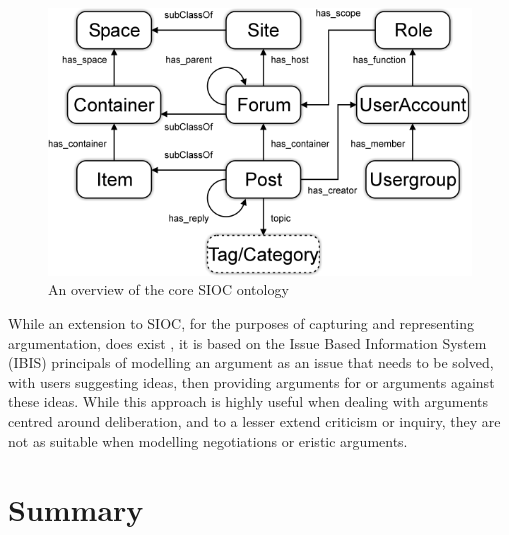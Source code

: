 \begin{figure}
\begin{center}
\includegraphics[scale=1.75]{./figures/ontologies/sioc.png}
\caption[An overview of the core SIOC ontology]{An overview of the core SIOC ontology\protect\footnotemark}
\label{figure:sioc}
\end{center}
\end{figure}

While an extension to SIOC, for the purposes of capturing and representing argumentation, does exist \citep{Lange2008}, it is based on the Issue Based Information System (IBIS) principals of modelling an argument as an issue that needs to be solved, with users suggesting ideas, then providing arguments for or arguments against these ideas. While this approach is highly useful when dealing with arguments centred around deliberation, and to a lesser extend criticism or inquiry, they are not as suitable when modelling negotiations or eristic arguments.

\section{Summary}
